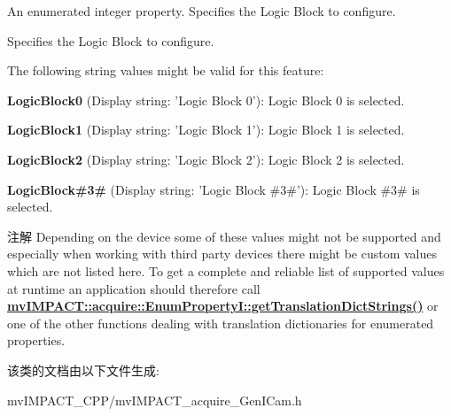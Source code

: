 An enumerated integer property. Specifies the Logic Block to configure. 

Specifies the Logic Block to configure.

The following string values might be valid for this feature\+:
\begin{DoxyItemize}
\item {\bfseries Logic\+Block0} (Display string\+: 'Logic Block 0')\+: Logic Block 0 is selected.
\item {\bfseries Logic\+Block1} (Display string\+: 'Logic Block 1')\+: Logic Block 1 is selected.
\item {\bfseries Logic\+Block2} (Display string\+: 'Logic Block 2')\+: Logic Block 2 is selected.
\item {\bfseries Logic\+Block\#3\#} (Display string\+: 'Logic Block \#3\#')\+: Logic Block \#3\# is selected.
\end{DoxyItemize}

\begin{DoxyNote}{注解}
Depending on the device some of these values might not be supported and especially when working with third party devices there might be custom values which are not listed here. To get a complete and reliable list of supported values at runtime an application should therefore call {\bfseries \hyperlink{classmv_i_m_p_a_c_t_1_1acquire_1_1_enum_property_i_a0ba6ccbf5ee69784d5d0b537924d26b6}{mv\+I\+M\+P\+A\+C\+T\+::acquire\+::\+Enum\+Property\+I\+::get\+Translation\+Dict\+Strings()}} or one of the other functions dealing with translation dictionaries for enumerated properties. 
\end{DoxyNote}


该类的文档由以下文件生成\+:\begin{DoxyCompactItemize}
\item 
mv\+I\+M\+P\+A\+C\+T\+\_\+\+C\+P\+P/mv\+I\+M\+P\+A\+C\+T\+\_\+acquire\+\_\+\+Gen\+I\+Cam.\+h\end{DoxyCompactItemize}

